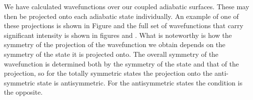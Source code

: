 %
%

We have calculated \hplus{} wavefunctions over our coupled adiabatic surfaces. These may then be projected onto each adiabatic state individually. An example of one of these projections is shown in Figure  and the full set of wavefunctions that carry significant intensity is shown in figures  and . What is noteworthy is how the symmetry of the projection of the wavefunction we obtain depends on the symmetry of the \htwo{} state it is projected onto. The overall symmetry of the wavefunction is determined both by the symmetry of the \htwo{} state and that of the \hplus{} projection, so for the totally symmetric states the projection onto the anti-symmetric \htwo{} state is antisymmetric. For the antisymmetric states the condition is the opposite.


%
